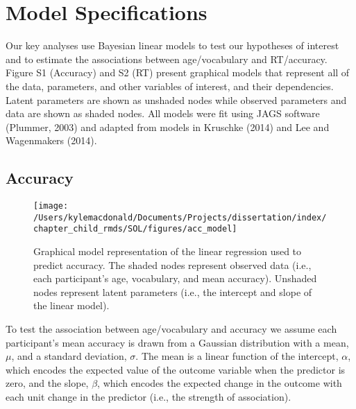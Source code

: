 \documentclass[oneside]{report}
\begin{document}
\section{Model Specifications}\label{model-specifications}

Our key analyses use Bayesian linear models to test our hypotheses of
interest and to estimate the associations between age/vocabulary and
RT/accuracy. Figure S1 (Accuracy) and S2 (RT) present graphical models
that represent all of the data, parameters, and other variables of
interest, and their dependencies. Latent parameters are shown as
unshaded nodes while observed parameters and data are shown as shaded
nodes. All models were fit using JAGS software (Plummer, 2003) and
adapted from models in Kruschke (2014) and Lee and Wagenmakers (2014).

\subsection{Accuracy}\label{accuracy}
\begin{figure}[t]

{\centering \texttt{[image: /Users/kylemacdonald/Documents/Projects/dissertation/index/chapter\_child\_rmds/SOL/figures/acc\_model]} 

}

\caption[Graphical representation of the accuracy model.]{Graphical model representation of the linear regression used to predict accuracy. The shaded nodes represent observed data (i.e., each participant's age, vocabulary, and mean accuracy). Unshaded nodes represent latent parameters (i.e., the intercept and slope of the linear model).}\label{fig:unnamed-chunk-7}
\end{figure}
To test the association between age/vocabulary and accuracy we assume
each participant's mean accuracy is drawn from a Gaussian distribution
with a mean, \(\mu\), and a standard deviation, \(\sigma\). The mean is
a linear function of the intercept, \(\alpha\), which encodes the
expected value of the outcome variable when the predictor is zero, and
the slope, \(\beta\), which encodes the expected change in the outcome
with each unit change in the predictor (i.e., the strength of
association).
\end{document}
